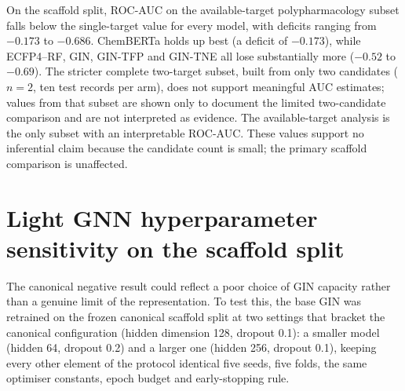 \documentclass[11pt,a4paper]{article}
\begin{document}
On the scaffold split, ROC-AUC on the available-target polypharmacology subset falls below the single-target value for every model, with deficits ranging from $-\num{0.173}$ to $-\num{0.686}$. ChemBERTa holds up best (a deficit of $-\num{0.173}$), while ECFP4--RF, GIN, GIN-TFP and GIN-TNE all lose substantially more ($-\num{0.52}$ to $-\num{0.69}$). The stricter complete two-target subset, built from only two candidates ($n=2$, ten test records per arm), does not support meaningful AUC estimates; values from that subset are shown only to document the limited two-candidate comparison and are not interpreted as evidence. The available-target analysis is the only subset with an interpretable ROC-AUC. These values support no inferential claim because the candidate count is small; the primary scaffold comparison is unaffected.

\section{Light GNN hyperparameter sensitivity on the scaffold split}
\label{sec:gnn_sensitivity_si}

The canonical negative result could reflect a poor choice of GIN capacity rather than a genuine limit of the representation. To test this, the base GIN was retrained on the frozen canonical scaffold split at two settings that bracket the canonical configuration (hidden dimension \num{128}, dropout \num{0.1}): a smaller model (hidden \num{64}, dropout \num{0.2}) and a larger one (hidden \num{256}, dropout \num{0.1}), keeping every other element of the protocol identical five seeds, five folds, the same optimiser constants, epoch budget and early-stopping rule.

\begin{table}[h]
\centering
\caption{Base-GIN sensitivity to hidden dimension and dropout on the scaffold split (\num{25} fold--seed records per configuration). The canonical configuration (hidden \num{128}, dropout \num{0.1}) reached ROC AUC \num{0.8047}.}
\label{tab:s3_gin_sensitivity}
\end{table}
\end{document}
